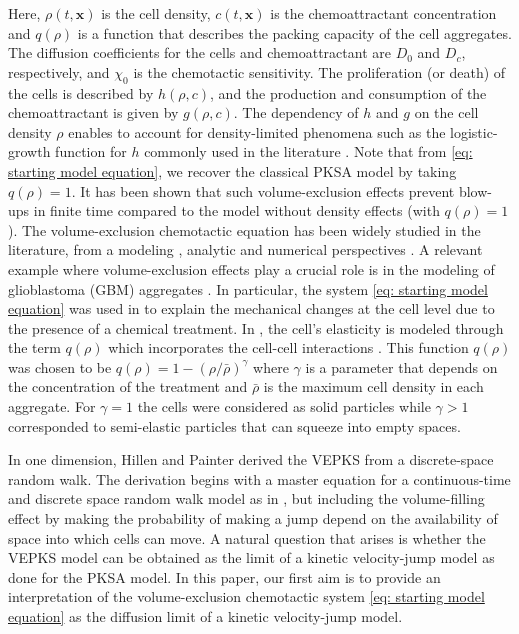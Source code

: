 \documentclass{aims} %
\theoremstyle{definition}
\begin{document}
{Here, $\rho(t,\mathbf{x})$ is the cell density, $c(t,\mathbf{x})$ is the chemoattractant concentration and  $q(\rho)$ is a function that describes the packing capacity of the cell aggregates.  The diffusion coefficients for the cells and chemoattractant are $D_0$ and $D_c$, respectively, and $\chi_0$ is the chemotactic sensitivity. The proliferation (or death) of the cells is described by $h(\rho,c)$,  and the production and consumption of the chemoattractant is given by $g(\rho,c)$. The dependency of $h$ and $g$ on the cell density $\rho$ enables to account for density-limited phenomena such as the logistic-growth function for $h$ commonly used in the literature \cite{murray2002introduction,murray2003mathematical}. Note that from \eqref{eq: starting model equation}, we recover the classical PKSA model by taking $q(\rho) = 1$.  It has been shown \cite{wrzosek2010volume,calvez2006volume,zheng2015boundedness} that such volume-exclusion effects prevent blow-ups in finite time compared to the model without density effects (with $q(\rho) = 1$). The volume-exclusion chemotactic equation has been widely studied in the literature, from a modeling \cite{painter2002volume,wang2010chemotaxis}, analytic \cite{wrzosek2010volume,han2017pattern,ma2012stationary,dolak2005keller} and numerical perspectives \cite{ibrahim2014efficacy}. A relevant example where volume-exclusion effects play a crucial role is in the modeling of glioblastoma (GBM) aggregates  \cite{Vital2011}. In particular, the  system \eqref{eq: starting model equation} was used in \cite{almeida2020treatment} to explain the mechanical changes at the cell level  due to the presence of a chemical treatment. In \cite{almeida2020treatment}, the cell's elasticity is modeled through the term $q(\rho)$ which incorporates the cell-cell interactions \cite{wang2007classical}. This function $q(\rho)$ was chosen to be $q(\rho)=1-(\rho/\bar{\rho})^\gamma$ where $\gamma$ is a parameter that depends on the concentration of the treatment and $\bar{\rho}$ is the maximum cell density in each aggregate. For $\gamma=1$ the cells were considered as solid particles while {$\gamma>1$  corresponded to semi-elastic particles} that can squeeze into empty spaces. 

In one dimension, Hillen and Painter \cite{painter2002volume} derived the VEPKS from a discrete-space random walk. The derivation begins with a master equation for a continuous-time and discrete space random walk model as in \cite{Othmer1997}, but including the volume-filling effect by making the probability of making a jump depend on the availability of space into which cells can move.  A natural question that arises is whether the VEPKS model can be obtained as the limit of a kinetic velocity-jump model as done for the PKSA model. 
In this paper, our first aim is to provide an interpretation of the volume-exclusion chemotactic system \eqref{eq: starting model equation} as the diffusion limit of a kinetic {{velocity-jump}} model.

}
\end{document}
